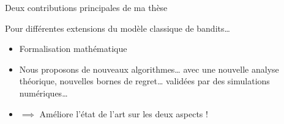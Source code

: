 \documentclass[11pt,english,ignorenonframetext,]{beamer}
\begin{document}


















\begin{frame}{Deux contributions principales de ma thèse}

Pour différentes extensions du modèle classique de bandits\ldots{}

\begin{itemize}
  \item
  Formalisation mathématique
  \item
  Nous proposons de nouveaux algorithmes\ldots{}
  \newline
  avec une nouvelle analyse théorique, nouvelles bornes de regret\ldots{}
  \newline
  validées par des simulations numériques\ldots{}
  \item
  $\implies$ Améliore l'état de l'art sur les deux aspects !
\end{itemize}

\end{frame}
\end{document}
